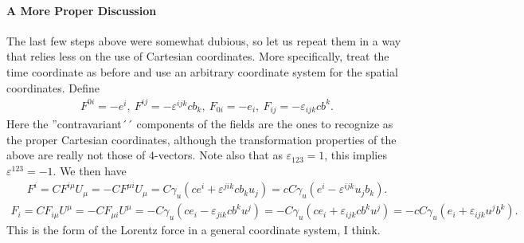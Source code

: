 \paragraph{A More Proper Discussion}
The last few steps above were somewhat dubious, so let us repeat them in a way that relies less on the use of Cartesian coordinates. More specifically, treat the time coordinate as before and use an arbitrary coordinate system for the spatial coordinates. Define
\begin{align*}
	F^{0i} = -e^{i},\ F^{ij} = -\varepsilon^{ijk}cb_{k},\ F_{0i} = -e_{i},\ F_{ij} = -\varepsilon_{ijk}cb^{k}.
\end{align*}
Here the ''contravariant´´ components of the fields are the ones to recognize as the proper Cartesian coordinates, although the transformation properties of the above are really not those of $4$-vectors. Note also that as $\varepsilon_{123} = 1$, this implies $\varepsilon^{123} = -1$. We then have
\begin{align*}
	F^{i} = CF^{i\mu}U_{\mu} = -CF^{\mu i}U_{\mu} = C\gamma_{u}(ce^{i} + \varepsilon^{jik}cb_{k}u_{j}) = cC\gamma_{u}(e^{i} - \varepsilon^{ijk}u_{j}b_{k}).
\end{align*}
\begin{align*}
	F_{i} = CF_{i\mu}U^{\mu} = -CF_{\mu i}U^{\mu} = -C\gamma_{u}(ce_{i} - \varepsilon_{jik}cb^{k}u^{j}) = -C\gamma_{u}(ce_{i} + \varepsilon_{ijk}cb^{k}u^{j}) = -cC\gamma_{u}(e_{i} + \varepsilon_{ijk}u^{j}b^{k}).
\end{align*}
This is the form of the Lorentz force in a general coordinate system, I think.

